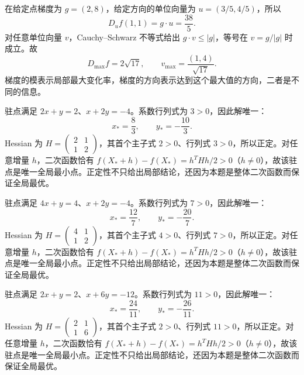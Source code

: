 \documentclass[12pt,fontset=fandol]{ctexart}
\begin{document}
\begin{solve}\label{ans:c34q13}
在给定点梯度为 $g=(2,8)$，给定方向的单位向量为 $u=(3/5,4/5)$，所以
\[
D_uf(1,1)=g\cdot u=\frac{38}{5}.
\]
对任意单位向量 $v$，Cauchy--Schwarz 不等式给出 $g\cdot v\le|g|$，等号在 $v=g/|g|$ 时成立。故
\[
D_{\max}f=2\sqrt{17},\qquad v_{\max}=\frac{(1,4)}{\sqrt{17}}.
\]
梯度的模表示局部最大变化率，梯度的方向表示达到这个最大值的方向，二者是不同的信息。
\end{solve}

\begin{solve}\label{ans:c34q14}
驻点满足 $2x+y=2$、$x+2y=-4$。系数行列式为 $3>0$，因此解唯一：
\[
x_*=\frac{8}{3},\qquad y_*=-\frac{10}{3}.
\]
Hessian 为 $H=\begin{pmatrix}2&1\\1&2\end{pmatrix}$，其首个主子式 $2>0$、行列式 $3>0$，所以正定。对任意增量 $h$，二次函数恰有 $f(X_*+h)-f(X_*)=h^THh/2>0$（$h\ne0$），故该驻点是唯一全局最小点。正定性不只给出局部结论，还因为本题是整体二次函数而保证全局最优。
\end{solve}

\begin{solve}\label{ans:c34q15}
驻点满足 $4x+y=4$、$x+2y=-4$。系数行列式为 $7>0$，因此解唯一：
\[
x_*=\frac{12}{7},\qquad y_*=-\frac{20}{7}.
\]
Hessian 为 $H=\begin{pmatrix}4&1\\1&2\end{pmatrix}$，其首个主子式 $4>0$、行列式 $7>0$，所以正定。对任意增量 $h$，二次函数恰有 $f(X_*+h)-f(X_*)=h^THh/2>0$（$h\ne0$），故该驻点是唯一全局最小点。正定性不只给出局部结论，还因为本题是整体二次函数而保证全局最优。
\end{solve}

\begin{solve}\label{ans:c34q16}
驻点满足 $2x+y=2$、$x+6y=-12$。系数行列式为 $11>0$，因此解唯一：
\[
x_*=\frac{24}{11},\qquad y_*=-\frac{26}{11}.
\]
Hessian 为 $H=\begin{pmatrix}2&1\\1&6\end{pmatrix}$，其首个主子式 $2>0$、行列式 $11>0$，所以正定。对任意增量 $h$，二次函数恰有 $f(X_*+h)-f(X_*)=h^THh/2>0$（$h\ne0$），故该驻点是唯一全局最小点。正定性不只给出局部结论，还因为本题是整体二次函数而保证全局最优。
\end{solve}
\end{document}
